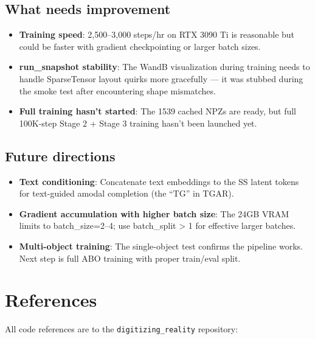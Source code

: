 \subsection{What needs improvement}

\begin{itemize}
  \item \textbf{Training speed}: 2,500--3,000 steps/hr on RTX 3090 Ti is reasonable
  but could be faster with gradient checkpointing or larger batch sizes.
  \item \textbf{run\_snapshot stability}: The WandB visualization during training
  needs to handle SparseTensor layout quirks more gracefully --- it was
  stubbed during the smoke test after encountering shape mismatches.
  \item \textbf{Full training hasn't started}: The 1539 cached NPZs are ready, but
  full 100K-step Stage 2 + Stage 3 training hasn't been launched yet.
\end{itemize}

\subsection{Future directions}

\begin{itemize}
  \item \textbf{Text conditioning}: Concatenate text embeddings to the SS latent
  tokens for text-guided amodal completion (the ``TG'' in TGAR).
  \item \textbf{Gradient accumulation with higher batch size}: The 24GB VRAM limits
  to batch\_size=2--4; use batch\_split \textgreater{} 1 for effective larger batches.
  \item \textbf{Multi-object training}: The single-object test confirms the pipeline
  works. Next step is full ABO training with proper train/eval split.
\end{itemize}

\section{References}

All code references are to the \texttt{digitizing\_reality} repository:

